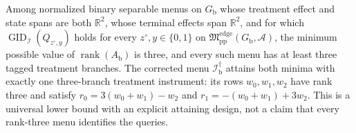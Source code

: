 Among normalized binary separable menus on \(G_{\mathrm b}\) whose treatment effect and state spans are both \(\mathbb R^2\), whose terminal effects span \(\mathbb R^2\), and for which \(\operatorname{GID}_{\mathcal I}(Q_{z^{\circ},y})\) holds for every \(z^{\circ},y\in\{0,1\}\) on \(\mathfrak M_{\mathrm{pp}}^{\mathrm{edge}}(G_{\mathrm b},\mathcal A)\), the minimum possible value of \(\operatorname{rank}(A_{\mathrm b})\) is three, and every such menu has at least three tagged treatment branches. The corrected menu \(\mathcal I_{\mathrm b}^{\dagger}\) attains both minima with exactly one three-branch treatment instrument: its rows \(w_0,w_1,w_2\) have rank three and satisfy \(r_0=3(w_0+w_1)-w_2\) and \(r_1=-(w_0+w_1)+3w_2\). This is a universal lower bound with an explicit attaining design, not a claim that every rank-three menu identifies the queries.